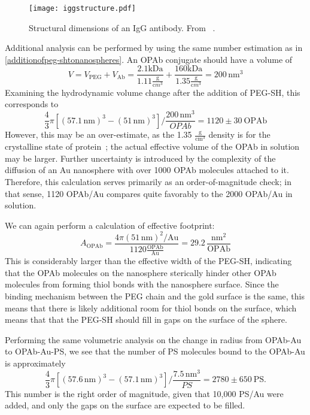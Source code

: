 \begin{figure}[htbp]
\centering
\texttt{[image: iggstructure.pdf]}
\caption{Structural dimensions of an IgG antibody. From ~\citep{antibodylength}.}
\label{iggstructure}
\end{figure}




Additional analysis can be performed by using the same number estimation as in \autoref{additionofpeg-shtonanospheres}. An OPAb conjugate should have a volume of
\[V=V_{\mathrm{PEG}}+V_{\mathrm{Ab}}=\frac{2.1\mathrm{kDa}}{1.11\frac{\mathrm g}{\mathrm cm^3}}+\frac{160\mathrm{kDa}}{1.35\frac{\mathrm g}{\mathrm cm^3}}=200\,\mathrm{nm}^3\]
Examining the hydrodynamic volume change after the addition of PEG-SH, this corresponds to
\[\frac{4}{3}\pi[(57.1\mathrm{\,nm})^3-(51\mathrm{\,nm})^3]/\frac{200\,\mathrm{nm}^3}{OPAb}=1120\pm30\mathrm{\ OPAb}\]
However, this may be an over-estimate, as the 1.35 $\mathrm{\frac{g}{cm^3}}$ density is for the crystalline state of protein~\citep{proteindensity}; the actual effective volume of the OPAb in solution may be larger. Further uncertainty is introduced by the complexity of the diffusion of an Au nanosphere with over 1000 OPAb molecules attached to it. Therefore, this calculation serves primarily as an order-of-magnitude check; in that sense, 1120 OPAb/Au compares quite favorably to the 2000 OPAb/Au in solution.

We can again perform a calculation of effective footprint: \[A_{\mathrm{OPAb}}=\frac{4\pi(51\mathrm{\,nm})^2/\mathrm{Au}}{1120\mathrm{\frac{OPAb}{Au}}}=29.2\,\frac{\mathrm{nm}^2}{\mathrm{OPAb}}\]
This is considerably larger than the effective width of the PEG-SH, indicating that the OPAb molecules on the nanosphere sterically hinder other OPAb molecules from forming thiol bonds with the nanosphere surface. Since the binding mechanism between the PEG chain and the gold surface is the same, this means that there is likely additional room for thiol bonds on the surface, which means that that the PEG-SH should fill in gaps on the surface of the sphere.

Performing the same volumetric analysis on the change in radius from OPAb-Au to OPAb-Au-PS, we see that the number of PS molecules bound to the OPAb-Au is approximately
\[\frac{4}{3}\pi[(57.6\mathrm{\,nm})^3-(57.1\mathrm{\,nm})^3]/\frac{7.5\,\mathrm{nm}^3}{PS}=2780\pm650\mathrm{\ PS}.\]
This number is the right order of magnitude, given that 10,000 PS\slash Au were added, and only the gaps on the surface are expected to be filled.

